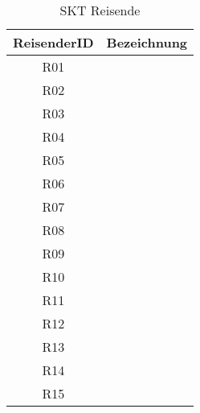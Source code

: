 %
\begin{table}[htbp]
\centering
\begin{tabular}{|c|c|}
\hline
ReisenderID&Bezeichnung\\
\hline
R01&\\
\hline
R02&\\
\hline
R03&\\
\hline
R04&\\
\hline
R05&\\
\hline
R06&\\
\hline
R07&\\
\hline
R08&\\
\hline
R09&\\
\hline
R10&\\
\hline
R11&\\
\hline
R12&\\
\hline
R13&\\
\hline
R14&\\
\hline
R15&\\
\hline
\end{tabular}
\caption{SKT Reisende}
\label{tab:SKTReisende}
\end{table}
